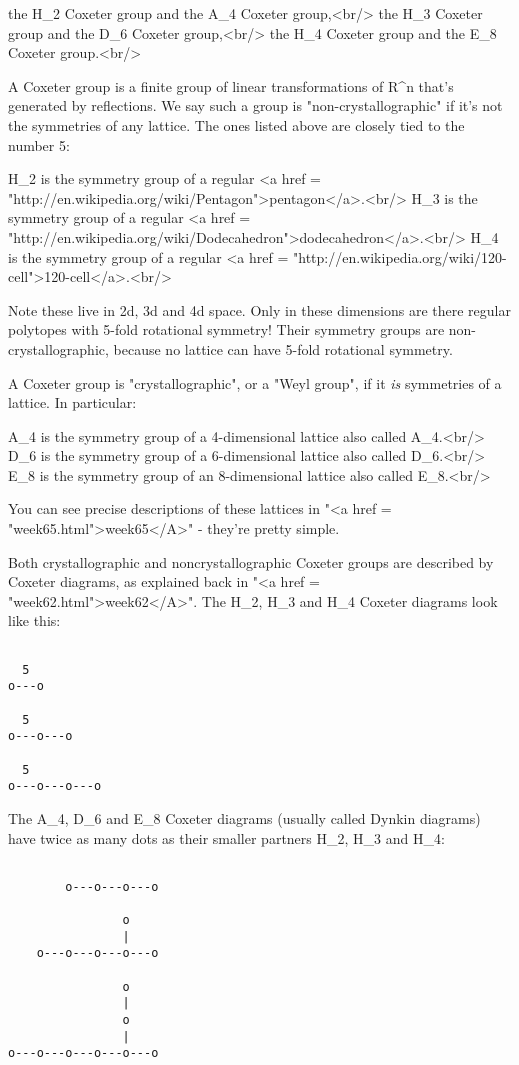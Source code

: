 the H_{2} Coxeter group and the A_{4} Coxeter group,<br/>
the H_{3} Coxeter group and the D_{6} Coxeter group,<br/>
the H_{4} Coxeter group and the E_{8} Coxeter group.<br/>

A Coxeter group is a finite group of linear transformations of 
R^{n} that's generated by reflections.  We say such a group is
"non-crystallographic" if it's not the symmetries of any lattice. 
The ones listed above are closely tied to the number 5:

H_{2} is the symmetry group of a regular 
<a href = "http://en.wikipedia.org/wiki/Pentagon">pentagon</a>.<br/>
H_{3} is the symmetry group of a regular <a href = "http://en.wikipedia.org/wiki/Dodecahedron">dodecahedron</a>.<br/>
H_{4} is the symmetry group of a regular <a href = "http://en.wikipedia.org/wiki/120-cell">120-cell</a>.<br/>

Note these live in 2d, 3d and 4d space.  Only in these dimensions 
are there regular polytopes with 5-fold rotational symmetry!  Their 
symmetry groups are non-crystallographic, because no lattice can 
have 5-fold rotational symmetry.

A Coxeter group is "crystallographic", or a "Weyl
group", if it \emph{is} symmetries of a lattice.  In particular:

A_{4} is the symmetry group of a 4-dimensional lattice also
called A_{4}.<br/> 
D_{6} is the symmetry group of a 6-dimensional lattice also 
called D_{6}.<br/> 
E_{8} is the symmetry group of an 8-dimensional lattice also 
called
E_{8}.<br/>

You can see precise descriptions of these lattices in "<a href = "week65.html">week65</A>" -
they're pretty simple.

Both crystallographic and noncrystallographic Coxeter groups are 
described by Coxeter diagrams, as explained back in "<a href = "week62.html">week62</A>".  The 
H_{2}, H_{3} and H_{4} Coxeter diagrams look like this:


\begin{verbatim}

  5
o---o

  5
o---o---o

  5
o---o---o---o
\end{verbatim}
    

The A_{4}, D_{6} and E_{8} Coxeter diagrams (usually
called Dynkin diagrams) have twice as many dots as their smaller
partners H_{2}, H_{3} and H_{4}:
 

\begin{verbatim}

        o---o---o---o

                o
                |
    o---o---o---o---o

                o
                |
                o
                | 
o---o---o---o---o---o
\end{verbatim}
    

